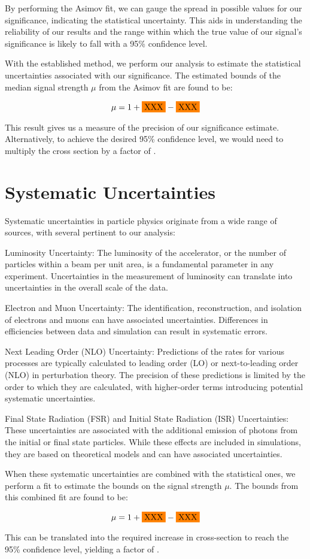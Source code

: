 By performing the Asimov fit, we can gauge the spread in possible values for our significance, indicating the
statistical uncertainty. This aids in understanding the reliability of our results and the range within which the true
value of our signal's significance is likely to fall with a 95\% confidence level.

With the established method, we perform our analysis to estimate the statistical uncertainties associated with our
significance. The estimated bounds of the median signal strength $\mu$ from the Asimov fit are found to be:

$$
    \mu = 1 + \placeholder{XXX} - \placeholder{XXX}
$$

This result gives us a measure of the precision of our significance estimate.
Alternatively, to achieve the desired 95\% confidence level, we would need to multiply the cross section by a factor of
.

\section{Systematic Uncertainties}

Systematic uncertainties in particle physics originate from a wide range of sources, with several pertinent to our
analysis:

Luminosity Uncertainty: The luminosity of the accelerator, or the number of particles within a beam per unit area, is a
fundamental parameter in any experiment. Uncertainties in the measurement of luminosity can translate into uncertainties
in the overall scale of the data.

Electron and Muon Uncertainty: The identification, reconstruction, and isolation of electrons and muons can have
associated uncertainties. Differences in efficiencies between data and simulation can result in systematic errors.

Next Leading Order (NLO) Uncertainty: Predictions of the rates for various processes are typically calculated to leading
order (LO) or next-to-leading order (NLO) in perturbation theory. The precision of these predictions is limited by the
order to which they are calculated, with higher-order terms introducing potential systematic uncertainties.

Final State Radiation (FSR) and Initial State Radiation (ISR) Uncertainties: These uncertainties are associated with the
additional emission of photons from the initial or final state particles. While these effects are included in
simulations, they are based on theoretical models and can have associated uncertainties.

When these systematic uncertainties are combined with the statistical ones, we perform a fit to estimate the bounds on
the signal strength $\mu$. The bounds from this combined fit are found to be:

$$
    \mu = 1 + \placeholder{XXX} - \placeholder{XXX}
$$

This can be translated into the required increase in cross-section to reach the 95\% confidence
level, yielding a factor of .